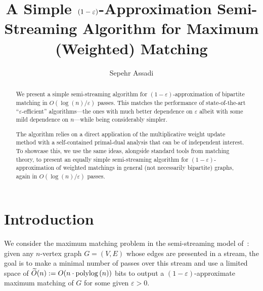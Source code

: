 \documentclass{article}
\title{A Simple \texorpdfstring{$(1-\eps)$}{(1-eps)}-Approximation Semi-Streaming Algorithm for Maximum (Weighted) Matching} %
\author{Sepehr Assadi}\date{}
\newcommand{\Ot}{\widetilde{O}}
\newcommand{\eps}{\varepsilon}
\newcommand{\poly}{\mbox{\rm poly}}
\begin{document}
\maketitle




\begin{abstract}


	We present a simple semi-streaming algorithm for $(1-\eps)$-approximation of bipartite matching in $O(\log{\!(n)}/\eps)$ passes. This 
	matches the performance of state-of-the-art ``$\eps$-efficient'' algorithms---the ones with much better dependence on  $\eps$ albeit with some mild dependence on $n$---while being considerably simpler. 
	
	
	The algorithm relies on a direct application of the multiplicative weight update method with a self-contained primal-dual analysis that can be of  independent interest. 
	To showcase this, we use the same ideas, alongside standard tools from matching  theory, to present an equally simple semi-streaming algorithm for $(1-\eps)$-approximation of weighted matchings in general (not necessarily bipartite) 
	graphs, again in $O(\log{\!(n)}/\eps)$ passes. 
\end{abstract}









\section{Introduction}\label{sec:intro}

We consider the maximum matching problem in the semi-streaming model of~\cite{FeigenbaumKMSZ05}: given any $n$-vertex graph $G=(V,E)$ whose edges are presented in a stream, the goal is to make a minimal number of passes
over this stream and use a limited space of $\Ot(n):= O(n \cdot \poly\!\log{(n)})$ bits to output a $(1-\eps)$-approximate maximum matching of $G$ for some given $\eps > 0$. 
\end{document}

